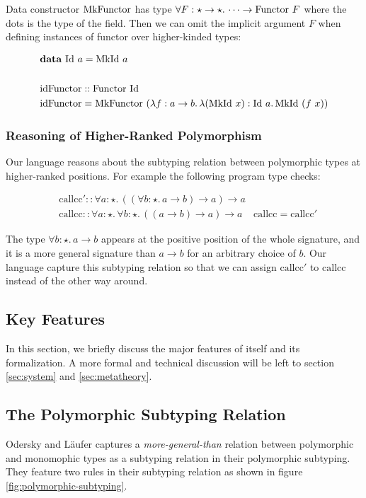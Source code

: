 Data constructor $\mathrm{MkFunctor}$ has type $\forall F : \star \rightarrow \star.\, \dots \rightarrow \mathrm{Functor}~F$ where the dots is the type of the field.
Then we can omit the implicit argument $F$ when defining instances of functor over higher-kinded types:

\begin{align*}
  & \mathbf{data}~\mathrm{Id}~a=\mathrm{MkId}~a \\
  \\
  & \mathrm{idFunctor} :: \mathrm{Functor}~\mathrm{Id} \\
  & \mathrm{idFunctor} = \mathrm{MkFunctor}~(\lambda f : a \rightarrow b.\, \lambda (\mathrm{MkId}~x) : \mathrm{Id}~a.\, \mathrm{MkId}~(f~x))
\end{align*}

\subsubsection{Reasoning of Higher-Ranked Polymorphism}
\label{sec:higher-ranked-poly}

Our language reasons about the subtyping relation between polymorphic types at
higher-ranked positions. For example the following program type checks:

\begin{align*}
& \mathrm{callcc}' :: \forall a : \star.\, ((\forall b : \star.\, a \rightarrow b) \rightarrow a) \rightarrow a
\\
& \mathrm{callcc} :: \forall a : \star.\, \forall b : \star.\, ((a \rightarrow b) \rightarrow a) \rightarrow a
& \mathrm{callcc} = \mathrm{callcc}'
\end{align*}

The type $\forall b : \star.\, a \rightarrow b$ appears at the positive position
of the whole signature, and it is a more general signature than $a \rightarrow b$
for an arbitrary choice of $b$. Our language capture this subtyping relation so that
 we can assign $\mathrm{callcc}'$ to $\mathrm{callcc}$ instead of the other way around.

\subsection{Key Features}

In this section, we briefly discuss the major features of \name itself and
its formalization. A more formal and technical discussion will be left to
section \ref{sec:system} and \ref{sec:metatheory}.

\subsection{The Polymorphic Subtyping Relation}
Odersky and L\"aufer captures a \emph{more-general-than} relation between
polymorphic and monomophic types as a subtyping relation in their polymorphic
subtyping\cite{odersky1996putting}. They feature two rules in their
subtyping relation as shown in figure \ref{fig:polymorphic-subtyping}.

